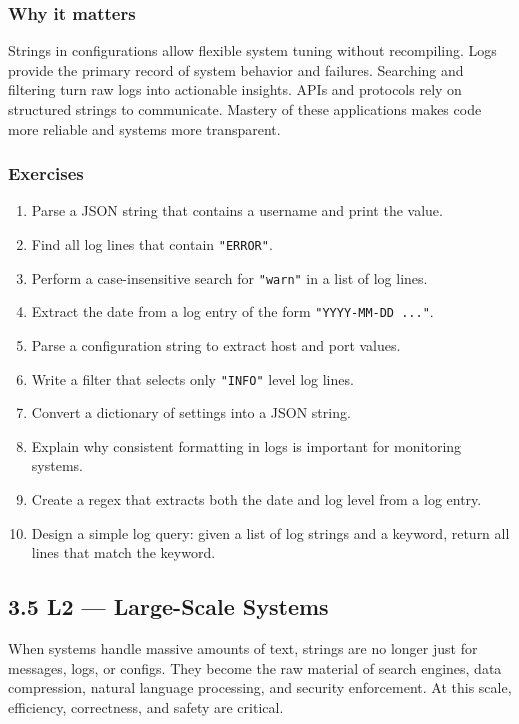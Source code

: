 \documentclass[
  letterpaper,
  DIV=11,
  numbers=noendperiod]{scrreprt}
\providecommand{\tightlist}{%
  \setlength{\itemsep}{0pt}\setlength{\parskip}{0pt}}
\begin{document}
\subsubsection{Why it matters}\label{why-it-matters-43}

Strings in configurations allow flexible system tuning without
recompiling. Logs provide the primary record of system behavior and
failures. Searching and filtering turn raw logs into actionable
insights. APIs and protocols rely on structured strings to communicate.
Mastery of these applications makes code more reliable and systems more
transparent.

\subsubsection{Exercises}\label{exercises-42}

\begin{enumerate}
\def\labelenumi{\arabic{enumi}.}
\tightlist
\item
  Parse a JSON string that contains a username and print the value.
\item
  Find all log lines that contain \texttt{"ERROR"}.
\item
  Perform a case-insensitive search for \texttt{"warn"} in a list of log
  lines.
\item
  Extract the date from a log entry of the form
  \texttt{"YYYY-MM-DD\ ..."}.
\item
  Parse a configuration string to extract host and port values.
\item
  Write a filter that selects only \texttt{"INFO"} level log lines.
\item
  Convert a dictionary of settings into a JSON string.
\item
  Explain why consistent formatting in logs is important for monitoring
  systems.
\item
  Create a regex that extracts both the date and log level from a log
  entry.
\item
  Design a simple log query: given a list of log strings and a keyword,
  return all lines that match the keyword.
\end{enumerate}

\subsection{3.5 L2 --- Large-Scale
Systems}\label{l2-large-scale-systems}

When systems handle massive amounts of text, strings are no longer just
for messages, logs, or configs. They become the raw material of search
engines, data compression, natural language processing, and security
enforcement. At this scale, efficiency, correctness, and safety are
critical.
\end{document}
